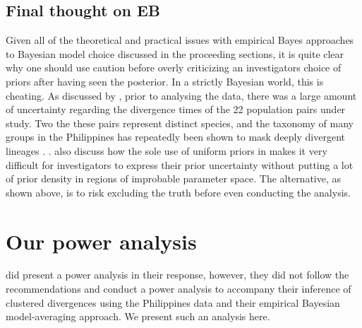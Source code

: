 \documentclass[letterpaper,12pt]{article}
\begin{document}
\begin{linenumbers}
\subsection*{Final thought on EB}
Given all of the theoretical and practical issues with empirical Bayes
approaches to Bayesian model choice discussed in the proceeding sections, it is
quite clear why one should use caution before overly criticizing an
investigators choice of priors after having seen the posterior.
In a strictly Bayesian world, this is cheating.
As discussed by \citet{Oaks2012}, prior to analysing the data, there was a large
amount of uncertainty regarding the divergence times of the 22 population pairs
under study.
Two the these pairs represent distinct species, and the taxonomy of many groups
in the Philippines has repeatedly been shown to mask deeply divergent lineages
\citep{RafeDiesmosAlcala2008,Linkem2010,Siler2010,Welton2010,Siler2011HerpMonographs,
Siler2011,Siler2012,RafeStuart2012}.
.
\citet{Oaks2012} also discuss how the sole use of uniform priors in \msb makes
it very difficult for investigators to express their prior uncertainty without
putting a lot of prior density in regions of improbable parameter space.
The alternative, as shown above, is to risk excluding the truth before even
conducting the analysis.






\section*{Our power analysis}
\citet{Hickerson2013} did present a power analysis in their response, however,
they did not follow the recommendations and conduct a power analysis to
accompany their inference of clustered divergences using the Philippines data
and their empirical Bayesian model-averaging approach.
We present such an analysis here.


\end{linenumbers}
\end{document}
